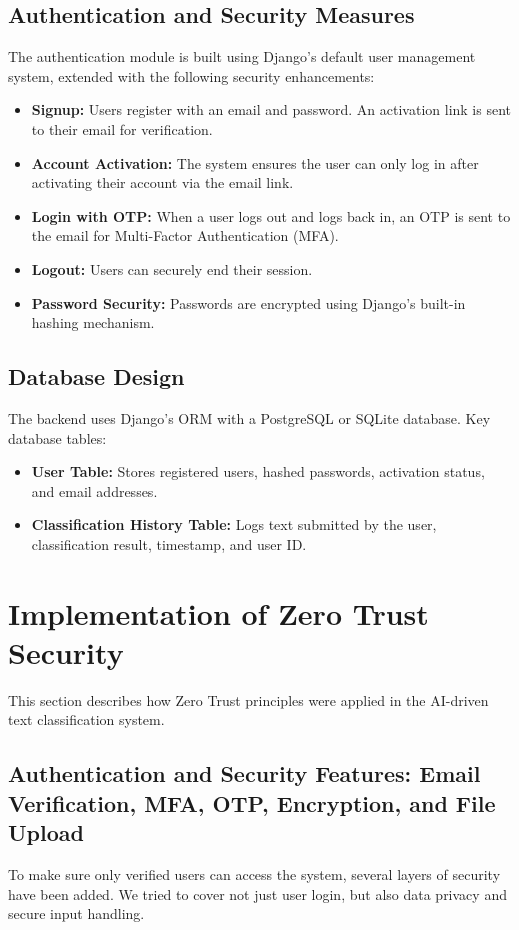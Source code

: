 \documentclass[a4paper,12pt]{article}
\begin{document}
\subsection{Authentication and Security Measures}
The authentication module is built using Django’s default user management system, extended with the following security enhancements:
\begin{itemize}
    \item \textbf{Signup:} Users register with an email and password. An activation link is sent to their email for verification.
    \item \textbf{Account Activation:} The system ensures the user can only log in after activating their account via the email link.
    \item \textbf{Login with OTP:} When a user logs out and logs back in, an OTP is sent to the email for Multi-Factor Authentication (MFA).
    \item \textbf{Logout:} Users can securely end their session.
    \item \textbf{Password Security:} Passwords are encrypted using Django’s built-in hashing mechanism.
\end{itemize}

\subsection{Database Design}
The backend uses Django’s ORM with a PostgreSQL or SQLite database. Key database tables:
\begin{itemize}
    \item \textbf{User Table:} Stores registered users, hashed passwords, activation status, and email addresses.
    \item \textbf{Classification History Table:} Logs text submitted by the user, classification result, timestamp, and user ID.
\end{itemize}

\section{Implementation of Zero Trust Security}

This section describes how Zero Trust principles were applied in the AI-driven text classification system.

\subsection{Authentication and Security Features: Email Verification, MFA, OTP, Encryption, and File Upload}
To make sure only verified users can access the system, several layers of security have been added. We tried to cover not just user login, but also data privacy and secure input handling.
\end{document}
